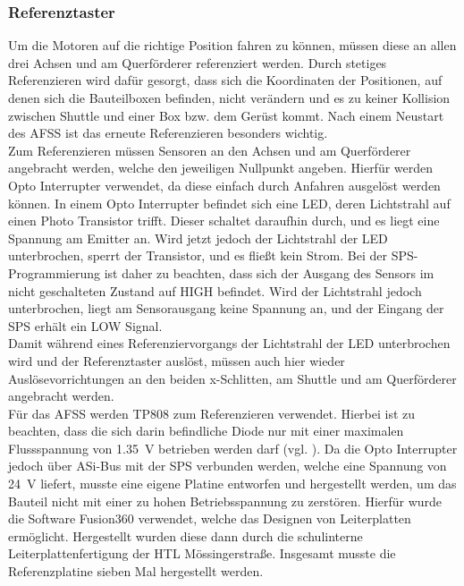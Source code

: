 \subsubsection{Referenztaster}
Um die Motoren auf die richtige Position fahren zu können, müssen diese an allen drei Achsen und am Querförderer referenziert werden. Durch stetiges Referenzieren wird dafür gesorgt, dass sich die Koordinaten der Positionen, auf denen sich die Bauteilboxen befinden, nicht verändern und es zu keiner Kollision zwischen Shuttle und einer Box bzw. dem Gerüst kommt. Nach einem Neustart des AFSS ist das erneute Referenzieren besonders wichtig.\\
Zum Referenzieren müssen Sensoren an den Achsen und am Querförderer angebracht werden, welche den jeweiligen Nullpunkt angeben. Hierfür werden Opto Interrupter verwendet, da diese einfach durch Anfahren ausgelöst werden können. In einem Opto Interrupter befindet sich eine LED, deren Lichtstrahl auf einen Photo Transistor trifft. Dieser schaltet daraufhin durch, und es liegt eine Spannung am Emitter an. Wird jetzt jedoch der Lichtstrahl der LED unterbrochen, sperrt der Transistor, und es fließt kein Strom. Bei der SPS-Programmierung ist daher zu beachten, dass sich der Ausgang des Sensors im nicht geschalteten Zustand auf HIGH befindet. Wird der Lichtstrahl jedoch unterbrochen, liegt am Sensorausgang keine Spannung an, und der Eingang der SPS erhält ein LOW Signal.\\
Damit während eines Referenziervorgangs der Lichtstrahl der LED unterbrochen wird und der Referenztaster auslöst, müssen auch hier wieder Auslösevorrichtungen an den beiden x-Schlitten, am Shuttle und am Querförderer angebracht werden.\\
Für das AFSS werden TP808 zum Referenzieren verwendet. Hierbei ist zu beachten, dass die sich darin befindliche Diode nur mit einer maximalen Flussspannung von \qty{1.35}{\volt} betrieben werden darf (vgl. \cite{TP808}). Da die Opto Interrupter jedoch über ASi-Bus mit der SPS verbunden werden, welche eine Spannung von \qty{24}{\volt} liefert, musste eine eigene Platine entworfen und hergestellt werden, um das Bauteil nicht mit einer zu hohen Betriebsspannung zu zerstören. Hierfür wurde die Software Fusion360 verwendet, welche das Designen von Leiterplatten ermöglicht. Hergestellt wurden diese dann durch die schulinterne Leiterplattenfertigung der HTL Mössingerstraße. Insgesamt musste die Referenzplatine sieben Mal hergestellt werden.

